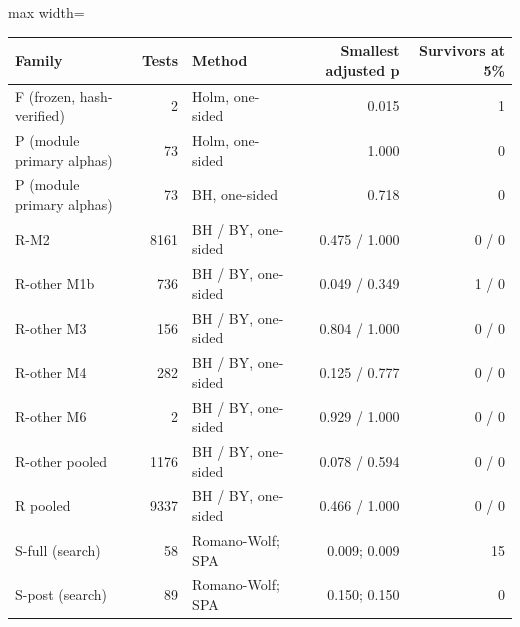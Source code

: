 \begin{adjustbox}{max width=\linewidth}
\begin{tabular}{lrlrr}
\toprule
Family & Tests & Method & Smallest adjusted p & Survivors at 5\% \\
\midrule
F (frozen, hash-verified) & 2 & Holm, one-sided & 0.015 & 1 \\
P (module primary alphas) & 73 & Holm, one-sided & 1.000 & 0 \\
P (module primary alphas) & 73 & BH, one-sided & 0.718 & 0 \\
R-M2 & 8161 & BH / BY, one-sided & 0.475 / 1.000 & 0 / 0 \\
R-other M1b & 736 & BH / BY, one-sided & 0.049 / 0.349 & 1 / 0 \\
R-other M3 & 156 & BH / BY, one-sided & 0.804 / 1.000 & 0 / 0 \\
R-other M4 & 282 & BH / BY, one-sided & 0.125 / 0.777 & 0 / 0 \\
R-other M6 & 2 & BH / BY, one-sided & 0.929 / 1.000 & 0 / 0 \\
R-other pooled & 1176 & BH / BY, one-sided & 0.078 / 0.594 & 0 / 0 \\
R pooled & 9337 & BH / BY, one-sided & 0.466 / 1.000 & 0 / 0 \\
S-full (search) & 58 & Romano-Wolf; SPA & 0.009; 0.009 & 15 \\
S-post (search) & 89 & Romano-Wolf; SPA & 0.150; 0.150 & 0 \\
\bottomrule
\end{tabular}
\end{adjustbox}
\par{}
